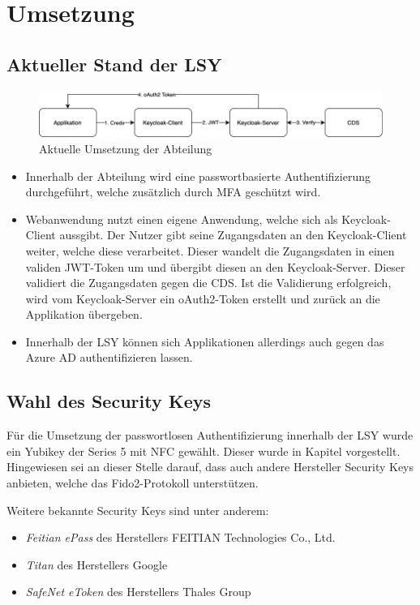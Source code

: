 \chapter{Umsetzung}

\section{Aktueller Stand der LSY}
\begin{figure}[h]
	\centering 
	\includegraphics[width=1\textwidth]{img/abbildungen/Unknown.png}
	\captionsetup{format=hang}
	\caption{Aktuelle Umsetzung der Abteilung}
\end{figure}

\begin{itemize}
    \item Innerhalb der Abteilung wird eine passwortbasierte Authentifizierung durchgeführt, welche zusätzlich durch \ac{MFA} geschützt wird.
    \item Webanwendung nutzt einen eigene Anwendung, welche sich als Keycloak-Client aussgibt. Der Nutzer gibt seine Zugangsdaten an den Keycloak-Client weiter, welche diese verarbeitet. Dieser wandelt die Zugangsdaten in einen validen JWT-Token um und übergibt diesen an den Keycloak-Server. Dieser validiert die Zugangsdaten gegen die \ac{CDS}. Ist die Validierung erfolgreich, wird vom Keycloak-Server ein oAuth2-Token erstellt und zurück an die Applikation übergeben.
    \item Innerhalb der \ac{LSY} können sich Applikationen allerdings auch gegen das Azure \ac{AD} authentifizieren lassen. 
\end{itemize}

\section{Wahl des Security Keys}
Für die Umsetzung der passwortlosen Authentifizierung innerhalb der \ac{LSY} wurde ein Yubikey der Series 5 mit NFC gewählt. Dieser wurde in Kapitel vorgestellt. Hingewiesen sei an dieser Stelle darauf, dass auch andere Hersteller Security Keys anbieten, welche das Fido2-Protokoll unterstützen. 

Weitere bekannte Security Keys sind unter anderem:
\begin{itemize}
    \item \textit{Feitian ePass} des Herstellers FEITIAN Technologies Co., Ltd.
    \item \textit{Titan} des Herstellers Google
    \item \textit{SafeNet eToken} des Herstellers Thales Group
\end{itemize}

